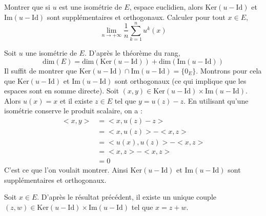\documentclass[a4paper,10pt]{report}
\begin{document}
\begin{Exa} Montrer que si $u$ est une isométrie de $E$, espace euclidien, alors $\textrm{Ker}(u-\textrm{Id})$ et $\textrm{Im}(u-\textrm{Id})$ sont supplémentaires et orthogonaux. Calculer pour tout $x \in E$,
$$  \lim_{n \rightarrow + \infty} \dfrac{1}{n} \sum_{k=1}^n u^k(x)$$
\end{Exa}

\corr Soit $u$ une isométrie de $E$. D'après le théorème du rang,
$$ \textrm{dim}(E) = \textrm{dim}(\textrm{Ker}(u-\textrm{Id})) + \textrm{dim}(\textrm{Im}(u-\textrm{Id}))$$
Il suffit de montrer que $\textrm{Ker}(u-\textrm{Id}) \cap \textrm{Im}(u-\textrm{Id})= \lbrace 0_E \rbrace$. Montrons pour cela que   $\textrm{Ker}(u-\textrm{Id})$ et $\textrm{Im}(u-\textrm{Id})$ sont orthogonaux (ce qui implique que les espaces sont en somme directe). Soit $(x,y) \in \textrm{Ker}(u-\textrm{Id}) \times \textrm{Im}(u-\textrm{Id})$. Alors $u(x)=x$ et il existe $z \in E$ tel que $y=u(z)-z$. En utilisant qu'une isométrie conserve le produit scalaire, on a :
\begin{align*}
<x,y> & = <x,u(z)-z> \\
& = <x,u(z)>-<x,z> \\
& = <u(x),u(z)> - <x,z> \\
& = <x,z>-<x,z> \\
& = 0
\end{align*}
C'est ce que l'on voulait montrer. Ainsi $\textrm{Ker}(u-\textrm{Id})$ et $\textrm{Im}(u-\textrm{Id})$ sont supplémentaires et orthogonaux. 

\medskip

\noindent Soit $x \in E$. D'après le résultat précédent, il existe un unique couple $(z,w) \in \textrm{Ker}(u-\textrm{Id}) \times \textrm{Im}(u-\textrm{Id})$ tel que $x=z+w$.
\end{document}
